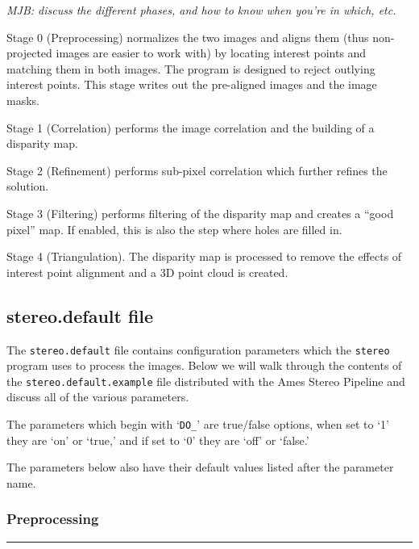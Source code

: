 \emph{MJB: discuss the different phases, and how to know when you're
in which, etc.}

Stage 0 (Preprocessing) normalizes the two images and aligns them
(thus non-projected images are easier to work with) by locating
interest points and matching them in both images. The program is
designed to reject outlying interest points.  This stage writes out
the pre-aligned images and the image masks.

Stage 1 (Correlation) performs the image correlation and the building
of a disparity map.

Stage 2 (Refinement) performs sub-pixel correlation which further
refines the solution.

Stage 3 (Filtering) performs filtering of the disparity map and
creates a ``good pixel'' map.  If enabled, this is also the step
where holes are filled in.

Stage 4 (Triangulation). The disparity map is processed to remove
the effects of interest point alignment and a 3D point cloud is
created.


\subsection{stereo.default file}
\label{stereo.default}

The \texttt{stereo.default} file contains configuration parameters
which the \texttt{stereo} program uses to process the images.  Below
we will walk through the contents of the \texttt{stereo.default.example}
file distributed with the Ames Stereo Pipeline and discuss all of
the various parameters.

The parameters which begin with `\texttt{DO\_}' are true/false options,
when set to `1' they are `on' or `true,' and if set to `0' they are
`off' or `false.'

The parameters below also have their default values listed after
the parameter name.

\subsubsection*{Preprocessing}
\hrule
\bigskip

